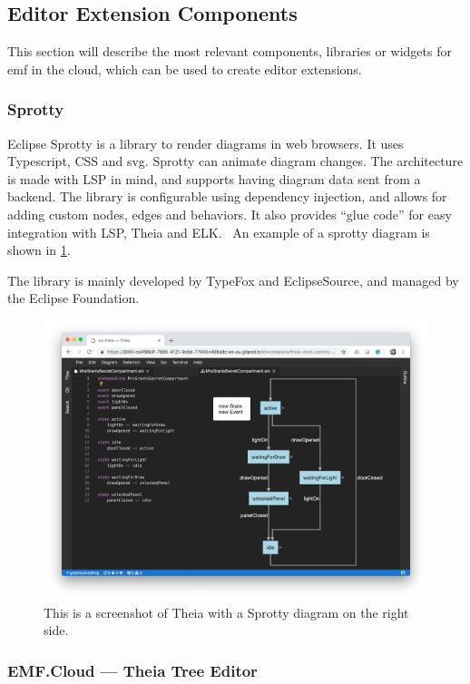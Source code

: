 \subsection{Editor Extension Components}

This section will describe the most relevant components, libraries or widgets for \acrshort{emf} in the \gls{cloud}, which can be used to create editor extensions.


\subsubsection{Sprotty}
Eclipse Sprotty is a library to render diagrams in web browsers.
It uses Typescript, CSS and svg.
Sprotty can animate diagram changes.
The architecture is made with \gls{LSP} in mind, and supports having diagram data sent from a backend.
The library is configurable using dependency injection, and allows for adding custom nodes, edges and behaviors.
It also provides ``glue code'' for easy integration with \gls{LSP}, \gls{Theia} and \gls{ELK}.~\cite{smithEclipseSprotty2018}
An example of a sprotty diagram is shown in \cref{fig:sprotty-example}.

The library is mainly developed by TypeFox and EclipseSource, and managed by the Eclipse Foundation.~\cite{eclipsefoundationEclipseSprotty}

\begin{figure}[htbp]  %
  \centering
  \includegraphics[width=.5\textwidth]{figures/sprotty-example.png}
  \caption[Sprotty Example]{This is a screenshot of Theia with a Sprotty diagram on the right side.~\cite{eclipsefoundationEclipseSprotty2020}}\label{fig:sprotty-example}
\end{figure}



\subsubsection{EMF.Cloud --- Theia Tree Editor}

% 
